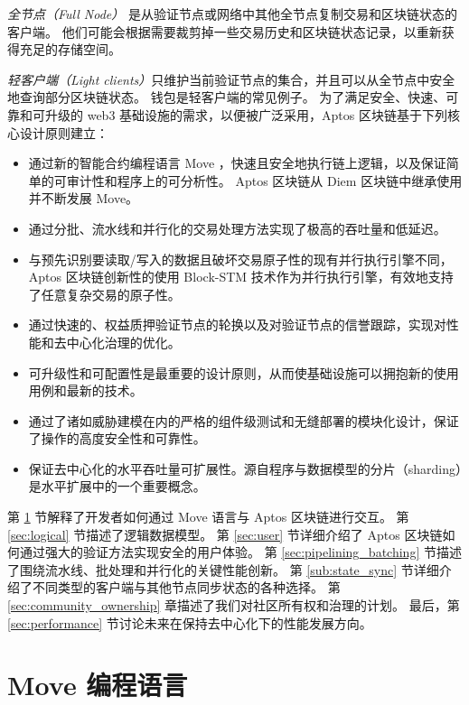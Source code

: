 \documentclass{article}
\begin{document}
\emph{全节点（Full Node）} 是从验证节点或网络中其他全节点复制交易和区块链状态的客户端。 他们可能会根据需要裁剪掉一些交易历史和区块链状态记录，以重新获得充足的存储空间。 

\emph{轻客户端（Light clients）}只维护当前验证节点的集合，并且可以从全节点中安全地查询部分区块链状态。 钱包是轻客户端的常见例子。
为了满足安全、快速、可靠和可升级的 web3 基础设施的需求，以便被广泛采用，Aptos 区块链基于下列核心设计原则建立：

\begin{itemize}
\item 通过新的智能合约编程语言 Move \cite{move}，快速且安全地执行链上逻辑，以及保证简单的可审计性和程序上的可分析性。 Aptos 区块链从 Diem 区块链中继承使用并不断发展 Move。

\item 通过分批、流水线和并行化的交易处理方法实现了极高的吞吐量和低延迟。

\item 与预先识别要读取/写入的数据且破坏交易原子性的现有并行执行引擎不同，Aptos 区块链创新性的使用 Block-STM 技术作为并行执行引擎，有效地支持了任意复杂交易的原子性。

\item 通过快速的、权益质押验证节点的轮换以及对验证节点的信誉跟踪，实现对性能和去中心化治理的优化。

\item 可升级性和可配置性是最重要的设计原则，从而使基础设施可以拥抱新的使用用例和最新的技术。

\item 通过了诸如威胁建模在内的严格的组件级测试和无缝部署的模块化设计，保证了操作的高度安全性和可靠性。


\item 保证去中心化的水平吞吐量可扩展性。源自程序与数据模型的分片（sharding）是水平扩展中的一个重要概念。

\end{itemize}
第 \ref{sec:move} 节解释了开发者如何通过 Move 语言与 Aptos 区块链进行交互。 第 \ref{sec:logical} 节描述了逻辑数据模型。 第 \ref{sec:user} 节详细介绍了 Aptos 区块链如何通过强大的验证方法实现安全的用户体验。 第 \ref{sec:pipelining_batching} 节描述了围绕流水线、批处理和并行化的关键性能创新。 第 \ref{sub:state_sync} 节详细介绍了不同类型的客户端与其他节点同步状态的各种选择。 第 \ref{sec:community_ownership} 章描述了我们对社区所有权和治理的计划。 最后，第 \ref{sec:performance} 节讨论未来在保持去中心化下的性能发展方向。

\section{Move 编程语言}
\label{sec:move}
\end{document}
